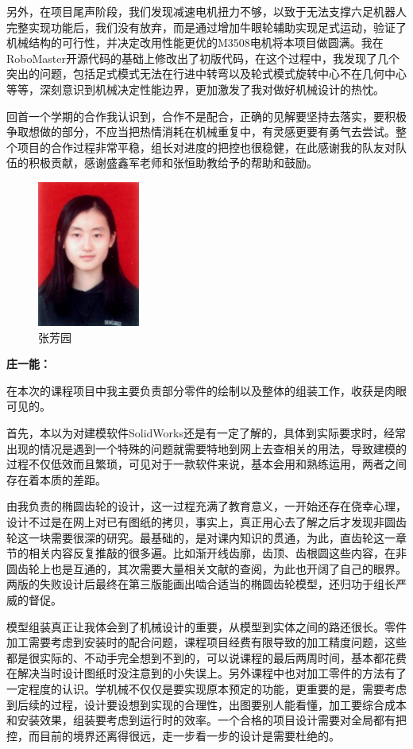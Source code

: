 \documentclass[12pt]{article}
\begin{document}
\begin{CJK}{UTF8}{song}
另外，在项目尾声阶段，我们发现减速电机扭力不够，以致于无法支撑六足机器人完整实现功能后，我们没有放弃，而是通过增加牛眼轮辅助实现足式运动，验证了机械结构的可行性，并决定改用性能更优的M3508电机将本项目做圆满。我在RoboMaster开源代码的基础上修改出了初版代码，在这个过程中，我发现了几个突出的问题，包括足式模式无法在行进中转弯以及轮式模式旋转中心不在几何中心等等，深刻意识到机械决定性能边界，更加激发了我对做好机械设计的热忱。\par
回首一个学期的合作我认识到，合作不是配合，正确的见解要坚持去落实，要积极争取想做的部分，不应当把热情消耗在机械重复中，有灵感更要有勇气去尝试。整个项目的合作过程非常平稳，组长对进度的把控也很稳健，在此感谢我的队友对队伍的积极贡献，感谢盛鑫军老师和张恒助教给予的帮助和鼓励。
\begin{figure}[H]
\centering
\includegraphics[width=0.3\textwidth]{photo//fyy.jpg}
\caption{张芳园}
\end{figure}
\textbf{庄一能：}\par
在本次的课程项目中我主要负责部分零件的绘制以及整体的组装工作，收获是肉眼可见的。\par
首先，本以为对建模软件SolidWorks还是有一定了解的，具体到实际要求时，经常出现的情况是遇到一个特殊的问题就需要特地到网上去查相关的用法，导致建模的过程不仅低效而且繁琐，可见对于一款软件来说，基本会用和熟练运用，两者之间存在着本质的差距。\par
由我负责的椭圆齿轮的设计，这一过程充满了教育意义，一开始还存在侥幸心理，设计不过是在网上对已有图纸的拷贝，事实上，真正用心去了解之后才发现非圆齿轮这一块需要很深的研究。最基础的，是对课内知识的贯通，为此，直齿轮这一章节的相关内容反复推敲的很多遍。比如渐开线齿廓，齿顶、齿根圆这些内容，在非圆齿轮上也是互通的，其次需要大量相关文献的查阅，为此也开阔了自己的眼界。两版的失败设计后最终在第三版能画出啮合适当的椭圆齿轮模型，还归功于组长严威的督促。\par
模型组装真正让我体会到了机械设计的重要，从模型到实体之间的路还很长。零件加工需要考虑到安装时的配合问题，课程项目经费有限导致的加工精度问题，这些都是很实际的、不动手完全想到不到的，可以说课程的最后两周时间，基本都花费在解决当时设计图纸时没注意到的小失误上。另外课程中也对加工零件的方法有了一定程度的认识。学机械不仅仅是要实现原本预定的功能，更重要的是，需要考虑到后续的过程，设计要设想到实现的合理性，出图要别人能看懂，加工要综合成本和安装效果，组装要考虑到运行时的效率。一个合格的项目设计需要对全局都有把控，而目前的境界还离得很远，走一步看一步的设计是需要杜绝的。\par

\end{CJK}
\end{document}
